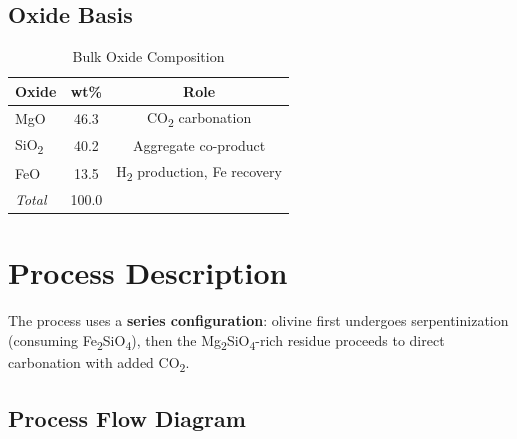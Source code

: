 \documentclass[11pt,a4paper]{article}
\begin{document}
\subsection{Oxide Basis}

\begin{table}[H]
\centering
\caption{Bulk Oxide Composition}
\label{tab:oxide}
\begin{tabular}{lcc}
\toprule
\textbf{Oxide} & \textbf{wt\%} & \textbf{Role} \\
\midrule
MgO                         & 46.3 & CO\textsubscript{2} carbonation \\
SiO\textsubscript{2}        & 40.2 & Aggregate co-product \\
FeO                         & 13.5 & H\textsubscript{2} production, Fe recovery \\
\midrule
\textit{Total}              & 100.0 & \\
\bottomrule
\end{tabular}
\end{table}

\section{Process Description}

The process uses a \textbf{series configuration}: olivine first undergoes serpentinization (consuming Fe\textsubscript{2}SiO\textsubscript{4}), then the Mg\textsubscript{2}SiO\textsubscript{4}-rich residue proceeds to direct carbonation with added CO\textsubscript{2}.

\subsection{Process Flow Diagram}
\end{document}
